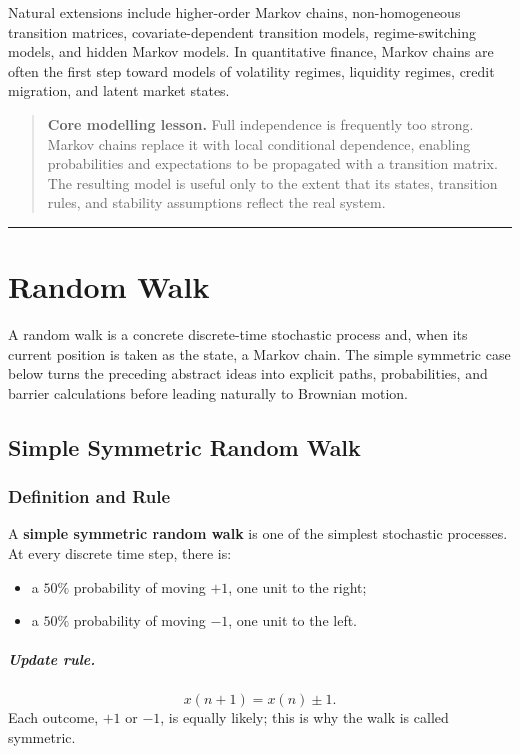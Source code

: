 \documentclass[12pt,openany]{book}
\theoremstyle{definition}
\theoremstyle{remark}
\begin{document}
Natural extensions include higher-order Markov chains, non-homogeneous
transition matrices, covariate-dependent transition models, regime-switching
models, and hidden Markov models. In quantitative finance, Markov chains are
often the first step toward models of volatility regimes, liquidity regimes,
credit migration, and latent market states.

\begin{quote}
\colorbox{diagramGreen!10}{%
\parbox{\dimexpr\linewidth-2\fboxsep\relax}{%
\textbf{Core modelling lesson.} Full independence is frequently too strong.
Markov chains replace it with local conditional dependence, enabling
probabilities and expectations to be propagated with a transition matrix.
The resulting model is useful only to the extent that its states, transition
rules, and stability assumptions reflect the real system.}}
\end{quote}

\medskip
\hrule
\medskip

\chapter{Random Walk}

A random walk is a concrete discrete-time stochastic process and, when its
current position is taken as the state, a Markov chain. The simple symmetric
case below turns the preceding abstract ideas into explicit paths,
probabilities, and barrier calculations before leading naturally to Brownian
motion.

\section{Simple Symmetric Random Walk}

\subsection{Definition and Rule}

A \textbf{simple symmetric random walk} is one of the simplest stochastic
processes. At every discrete time step, there is:
\begin{itemize}
    \item a \(50\%\) probability of moving \(+1\), one unit to the right;
    \item a \(50\%\) probability of moving \(-1\), one unit to the left.
\end{itemize}

\paragraph{Update rule.}
\[
x(n+1)=x(n)\pm 1.
\]
Each outcome, \(+1\) or \(-1\), is equally likely; this is why the walk is
called symmetric.
\end{document}
